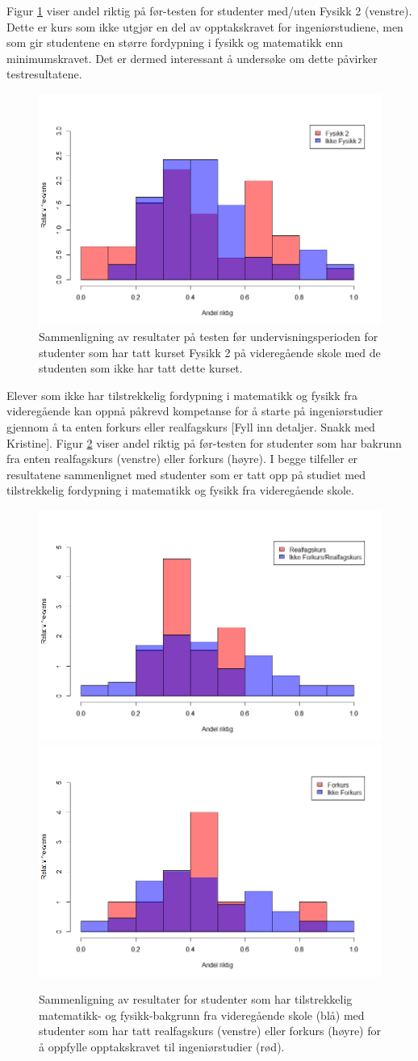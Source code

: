 \documentclass[a4paper,norsk,12pt]{article}
\begin{document}
Figur \ref{fig:fysmat} viser andel riktig på før-testen for studenter med/uten Fysikk 2 (venstre). Dette er kurs som ikke utgjør en del av opptakskravet for ingeniørstudiene, men som gir studentene en større fordypning i fysikk og matematikk enn minimumskravet. Det er dermed interessant å undersøke om dette påvirker testresultatene.
\begin{figure}[tp]
\begin{center}
	\includegraphics[width=.48\textwidth]{./fys2}
\end{center}
	\caption{Sammenligning av resultater på testen før undervisningsperioden for studenter som har tatt kurset Fysikk 2 på videregående skole med de studenten som ikke har tatt dette kurset.}
	\label{fig:fysmat}
\end{figure}

Elever som ikke har tilstrekkelig fordypning i matematikk og fysikk fra videregående kan oppnå påkrevd kompetanse for å starte på ingeniørstudier gjennom å ta enten forkurs eller realfagskurs {\color{red}[Fyll inn detaljer. Snakk med Kristine]}. Figur \ref{fig:forkurs} viser andel riktig på før-testen for studenter som har bakrunn fra enten realfagskurs (venstre) eller forkurs (høyre). I begge tilfeller er resultatene sammenlignet med studenter som er tatt opp på studiet med tilstrekkelig fordypning i matematikk og fysikk fra videregående skole.
\begin{figure}[tp]
	\includegraphics[width=.48\textwidth]{./real}
	\includegraphics[width=.48\textwidth]{./forkurs}
	\caption{ Sammenligning av resultater for studenter som har tilstrekkelig matematikk- og fysikk-bakgrunn fra videregående skole (blå) med studenter som har tatt realfagskurs (venstre) eller forkurs (høyre) for å oppfylle opptakskravet til ingeniørstudier (rød).}
	\label{fig:forkurs}
\end{figure}
\end{document}
